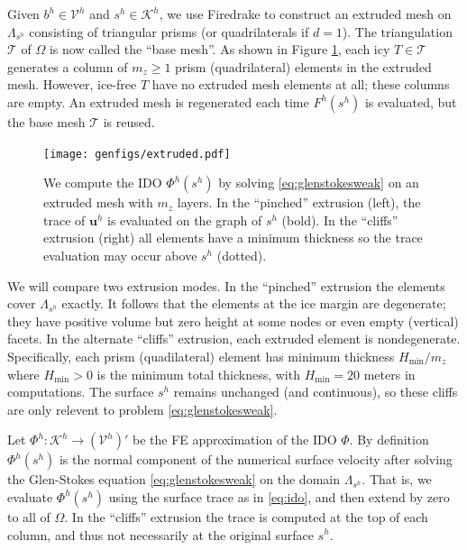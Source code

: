 \documentclass[letterpaper,final,12pt,reqno]{amsart}
\theoremstyle{claim}
\newcommand{\bu}{\mathbf{u}}
\numberwithin{equation}{section}
\numberwithin{figure}{section}
\numberwithin{table}{section}
\numberwithin{theorem}{section}
\begin{document}
Given $b^h \in \mathcal{V}^h$ and $s^h \in \mathcal{K}^h$, we use Firedrake to construct an extruded mesh \cite{McRaeetal2016} on $\Lambda_{s^h}$ consisting of triangular prisms (or quadrilaterals if $d=1$).  The triangulation $\mathcal{T}$ of $\Omega$ is now called the ``base mesh''.  As shown in Figure \ref{fig:extruded}, each icy $T \in \mathcal{T}$ generates a column of $m_z \ge 1$ prism (quadrilateral) elements in the extruded mesh.  However, ice-free $T$ have no extruded mesh elements at all; these columns are empty.  An extruded mesh is regenerated each time $F^h(s^h)$ is evaluated, but the base mesh $\mathcal{T}$ is reused.

\begin{figure}[t]
\begin{center}
\texttt{[image: genfigs/extruded.pdf]}
\end{center}
\caption{We compute the IDO $\Phi^h(s^h)$ by solving \eqref{eq:glenstokesweak} on an extruded mesh with $m_z$ layers.  In the ``pinched'' extrusion (left), the trace of $\bu^h$ is evaluated on the graph of $s^h$ (bold).  In the ``cliffs'' extrusion (right) all elements have a minimum thickness so the trace evaluation may occur above $s^h$ (dotted).}
\label{fig:extruded}
\end{figure}

We will compare two extrusion modes.  In the ``pinched'' extrusion the elements cover $\Lambda_{s^h}$ exactly.  It follows that the elements at the ice margin are degenerate; they have positive volume but zero height at some nodes or even empty (vertical) facets.  In the alternate ``cliffs'' extrusion, each extruded element is nondegenerate.  Specifically, each prism (quadilateral) element has minimum thickness $H_{\text{min}}/m_z$ where $H_{\text{min}} > 0$ is the minimum total thickness, with $H_{\text{min}} = 20$ meters in computations.  The surface $s^h$ remains unchanged (and continuous), so these cliffs are only relevent to problem \eqref{eq:glenstokesweak}.

Let $\Phi^h:\mathcal{K}^h \to (\mathcal{V}^h)'$ be the FE approximation of the IDO $\Phi$.  By definition $\Phi^h(s^h)$ is the normal component of the numerical surface velocity after solving the Glen-Stokes equation \eqref{eq:glenstokesweak} on the domain $\Lambda_{s^h}$.  That is, we evaluate $\Phi^h(s^h)$ using the surface trace as in \eqref{eq:ido}, and then extend by zero to all of $\Omega$.  In the ``cliffs'' extrusion the trace is computed at the top of each column, and thus not necessarily at the original surface $s^h$.
\end{document}
